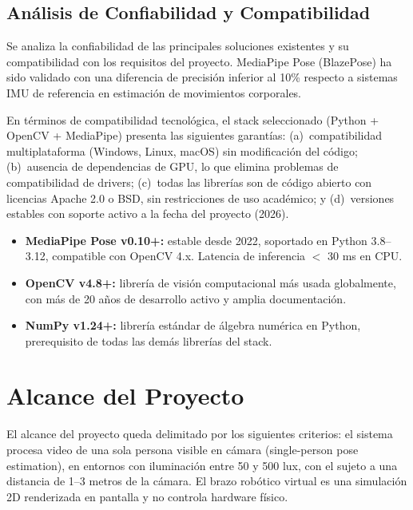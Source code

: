 \subsection{Análisis de Confiabilidad y Compatibilidad}

Se analiza la confiabilidad de las principales soluciones existentes y su
compatibilidad con los requisitos del proyecto. MediaPipe Pose (BlazePose)
ha sido validado con una diferencia de precisión
inferior al 10\% respecto a sistemas IMU de referencia en estimación de
movimientos corporales. \cite{Pauzietal2021}

En términos de compatibilidad tecnológica, el stack seleccionado
(Python + OpenCV + MediaPipe) presenta las siguientes garantías:
(a)~compatibilidad multiplataforma (Windows, Linux, macOS) sin modificación
del código; (b)~ausencia de dependencias de GPU, lo que elimina problemas
de compatibilidad de drivers; (c)~todas las librerías son de código
abierto con licencias Apache 2.0 o BSD, sin restricciones de uso
académico; y (d)~versiones estables con soporte activo a la fecha del
proyecto (2026). \cite{Bazarevskyetal2020, Lugaresietal2019, Bradski2000}

\begin{itemize}[leftmargin=1.5em]
  \item \textbf{MediaPipe Pose v0.10+:} estable desde 2022, soportado
        en Python 3.8--3.12, compatible con OpenCV 4.x. Latencia de
        inferencia $<$ 30 ms en CPU. \cite{Bazarevskyetal2020}
  \item \textbf{OpenCV v4.8+:} librería de visión computacional más
        usada globalmente, con más de 20 años de desarrollo activo y
        amplia documentación. \cite{Bradski2000}
  \item \textbf{NumPy v1.24+:} librería estándar de álgebra numérica
        en Python, prerequisito de todas las demás librerías del stack.
\end{itemize}

\section{Alcance del Proyecto}

El alcance del proyecto queda delimitado por los siguientes criterios:
el sistema procesa video de una sola persona visible en cámara
(single-person pose estimation), en entornos con iluminación
entre 50 y 500 lux, con el sujeto a una distancia de 1--3 metros de la
cámara. El brazo robótico virtual es una simulación 2D renderizada en
pantalla y no controla hardware físico. \cite{Vintimilla2026}

